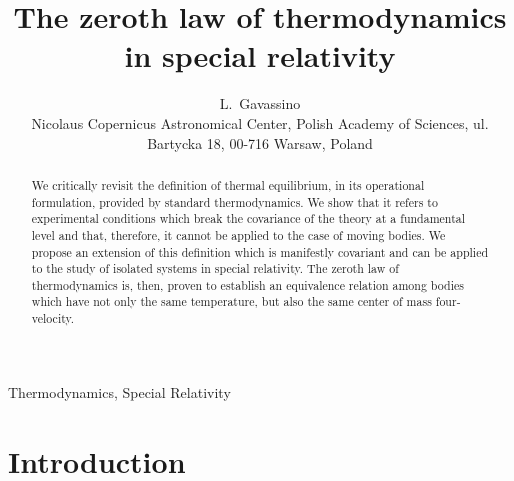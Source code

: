 \documentclass[twocolumn,usenatbib]{mnras2}
\title[Zeroth law of thermodynamics]{The zeroth law of thermodynamics in special relativity}
\author[L.~Gavassino]{L.~Gavassino\\
Nicolaus Copernicus Astronomical Center, Polish Academy of Sciences, ul. Bartycka 18, 00-716 Warsaw, Poland}
\begin{document}
\maketitle

\begin{abstract}
We critically revisit the definition of thermal equilibrium, in its operational formulation, provided by standard thermodynamics. We show that it refers to experimental conditions which break the covariance of the theory at a fundamental level and that, therefore, it cannot be applied to the case of moving bodies. We propose an extension of this definition which is manifestly covariant and can be applied to the study of isolated systems in special relativity. The zeroth law of thermodynamics is, then, proven to establish an equivalence relation among bodies which have not only the same temperature, but also the same center of mass four-velocity. 
\end{abstract} 


\begin{keywords}
Thermodynamics, Special Relativity
\end{keywords}


\section{Introduction} 


\end{document}
